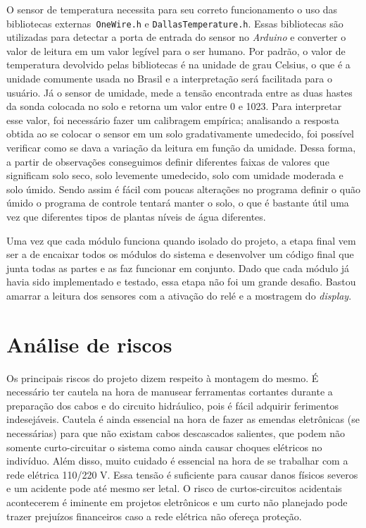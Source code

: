 \documentclass[a4paper,12pt]{article}
\begin{document}
    O sensor de temperatura necessita para seu correto funcionamento o uso das bibliotecas externas\texttt{ OneWire.h} e \texttt{DallasTemperature.h}. Essas bibliotecas são utilizadas para detectar a porta de entrada do sensor no \textit{Arduino} e converter o valor de leitura em um valor legível para o ser humano. Por padrão, o valor de temperatura devolvido pelas bibliotecas é na unidade de grau Celsius, o que é a unidade comumente usada no Brasil e a interpretação será facilitada para o usuário. Já o sensor de umidade, mede a tensão encontrada entre as duas hastes da sonda colocada no solo e retorna um valor entre 0 e 1023. Para interpretar esse valor, foi necessário fazer um calibragem empírica; analisando a resposta obtida ao se colocar o sensor em um solo gradativamente umedecido, foi possível verificar como se dava a variação da leitura em função da umidade. Dessa forma, a partir de observações conseguimos definir diferentes faixas de valores que significam solo seco, solo levemente umedecido, solo com umidade moderada e solo úmido. Sendo assim é fácil com poucas alterações no programa definir o quão úmido o programa de controle tentará manter o solo, o que é bastante útil uma vez que diferentes tipos de plantas níveis de água diferentes.

    Uma vez que cada módulo funciona quando isolado do projeto, a etapa final vem ser a de encaixar todos os módulos do sistema e desenvolver um código final que junta todas as partes e as faz funcionar em conjunto. Dado que cada módulo já havia sido implementado e testado, essa etapa não foi um grande desafio. Bastou amarrar a leitura dos sensores com a ativação do relé e a mostragem do \textit{display}.



\section{Análise de riscos}
Os principais riscos do projeto dizem respeito à montagem do mesmo. É necessário ter cautela na hora de manusear ferramentas cortantes durante a preparação dos cabos e do circuito hidráulico, pois é fácil adquirir ferimentos indesejáveis. Cautela é ainda essencial na hora de fazer as emendas eletrônicas (se necessárias) para que não existam cabos descascados salientes, que podem não somente curto-circuitar o sistema como ainda causar choques elétricos no indivíduo. Além disso, muito cuidado é essencial na hora de se trabalhar com a rede elétrica 110/220 V. Essa tensão é suficiente para causar danos físicos severos e um acidente pode até mesmo ser letal. \cite{halliday2008eletro} O risco de curtos-circuitos acidentais acontecerem é iminente em projetos eletrônicos e um curto não planejado pode trazer prejuízos financeiros caso a rede elétrica não ofereça proteção.
\end{document}
